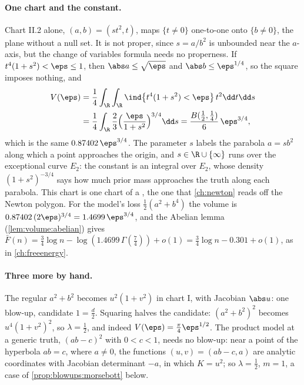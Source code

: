 \begin{refsection}
\paragraph{One chart and the constant.} Chart II.2 alone, $(a,b)=(st^2,t)$, maps $\{t\ne0\}$ one-to-one onto $\{b\ne0\}$, the plane without a null set. It is not proper, since $s=a/b^2$ is unbounded near the $a$-axis, but the change of variables formula needs no properness. If $t^4(1+s^2)<\eps\le1$, then $\abs a\le\sqrt\eps$ and $\abs b\le\eps^{1/4}$, so the square imposes nothing, and
\begin{equation}\label{eq:blowups:quarticvolume}
\begin{aligned}
V(\eps)&=\frac14\int_{\R}\int_{\R}\ind\bigl\{t^4(1+s^2)<\eps\bigr\}\,t^2\dd t\dd s\\
&=\frac14\int_\R\frac23\Bigl(\frac{\eps}{1+s^2}\Bigr)^{3/4}\dd s=\frac{B(\frac12,\frac14)}{6}\,\eps^{3/4},
\end{aligned}
\end{equation}
which is the same $0.87402\,\eps^{3/4}$. The parameter $s$ labels the parabola $a=sb^2$ along which a point approaches the origin, and $s\in\R\cup\{\infty\}$ runs over the exceptional curve $E_2$: the constant is an integral over $E_2$, whose density $(1+s^2)^{-3/4}$ says how much prior mass approaches the truth along each parabola. This chart is one chart of a , the one that \cref{ch:newton} reads off the Newton polygon. For the model's loss $\frac12(a^2+b^4)$ the volume is $0.87402\,(2\eps)^{3/4}=1.4699\,\eps^{3/4}$, and the Abelian lemma (\cref{lem:volume:abelian}) gives $\bar F(n)=\frac34\log n-\log(1.4699\,\Gamma(\frac74))+o(1)=\frac34\log n-0.301+o(1)$, as in \cref{ch:freeenergy}.

\paragraph{Three more by hand.} The regular $a^2+b^2$ becomes $u^2(1+v^2)$ in chart I, with Jacobian $\abs u$: one blow-up, candidate $1=\frac d2$. Squaring halves the candidate: $(a^2+b^2)^2$ becomes $u^4(1+v^2)^2$, so $\lambda=\frac12$, and indeed $V(\eps)=\frac\pi4\eps^{1/2}$. The product model at a generic truth, $(ab-c)^2$ with $0<c<1$, needs no blow-up: near a point of the hyperbola $ab=c$, where $a\ne0$, the functions $(u,v)=(ab-c,a)$ are analytic coordinates with Jacobian determinant $-a$, in which $K=u^2$; so $\lambda=\frac12$, $m=1$, a case of \cref{prop:blowups:morsebott} below.


\end{refsection}
